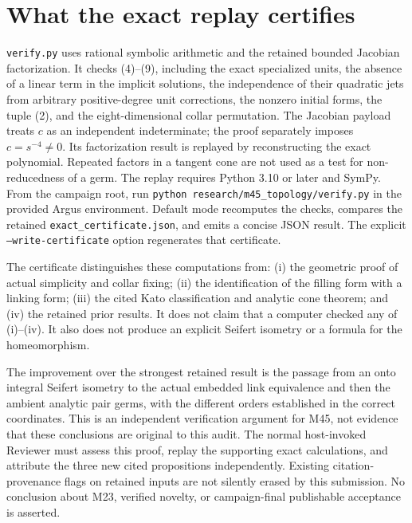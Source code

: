 \documentclass[11pt]{article}
\begin{document}
\section{What the exact replay certifies}

\texttt{verify.py} uses rational symbolic arithmetic and the retained
bounded Jacobian factorization. It checks (4)--(9), including the
exact specialized units, the absence of a linear term in the
implicit solutions, the independence of their quadratic jets from
arbitrary positive-degree unit corrections, the nonzero initial
forms, the tuple (2), and the eight-dimensional collar permutation.
The Jacobian payload treats \(c\) as an independent indeterminate;
the proof separately imposes \(c=s^{-4}\ne0\).
Its factorization result is replayed by reconstructing the exact
polynomial. Repeated factors in a tangent cone are not used as a
test for non-reducedness of a germ.
The replay requires Python 3.10 or later and SymPy. From the campaign
root, run \texttt{python research/m45\_topology/verify.py} in the
provided Argus environment. Default mode recomputes the checks,
compares the retained \texttt{exact\_certificate.json}, and emits
a concise JSON result. The explicit \texttt{--write-certificate}
option regenerates that certificate.

The certificate distinguishes these computations from:
(i) the geometric proof of actual simplicity and collar fixing;
(ii) the identification of the filling form with a linking form;
(iii) the cited Kato classification and analytic cone theorem; and
(iv) the retained prior results. It does not claim that a computer
checked any of (i)--(iv). It also does not produce an explicit
Seifert isometry or a formula for the homeomorphism.

The improvement over the strongest retained result is the passage
from an onto integral Seifert isometry to the actual embedded link
equivalence and then the ambient analytic pair germs, with the
different orders established in the correct coordinates.
This is an independent verification argument for M45, not evidence
that these conclusions are original to this audit.
The normal host-invoked Reviewer must assess this proof, replay the
supporting exact calculations, and attribute the three new cited
propositions independently. Existing citation-provenance flags on
retained inputs are not silently erased by this submission.
No conclusion about M23, verified novelty, or campaign-final
publishable acceptance is asserted.
\end{document}
